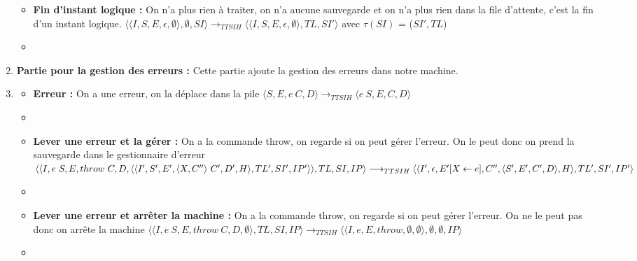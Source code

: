 \documentclass[10pt,a4paper]{report}
\begin{document}
\begin{enumerate}
\begin{itemize}
			\item[] \textbf{Fin d'instant logique :} On n'a plus rien à traiter, on n'a aucune sauvegarde et on n'a plus rien dans la file d'attente, c'est la fin d'un instant logique.
			\smallbreak
			$\langle\langle I,S,E,\epsilon,\emptyset \rangle ,\emptyset,SI\rangle 
			\longrightarrow_{TTSIH} 
			\langle\langle I,S,E,\epsilon,\emptyset\rangle,TL,SI'\rangle$
			avec $\tau(SI)$ = ($SI',TL$) 
			\item[]
			
		\end{itemize}
		\item[] \textbf{Partie pour la gestion des erreurs :} Cette partie ajoute la gestion des erreurs dans notre machine. 
		\item[]
		\begin{itemize}
			\item[] \textbf{Erreur :} On a une erreur, on la déplace dans la pile 
			\smallbreak
			$\langle S,E,e~C,D\rangle 
			\longrightarrow_{TTSIH} 
			\langle e~S,E,C,D\rangle $
			\item[]
			
			\item[] \textbf{Lever une erreur et la gérer :} On a la commande throw, on regarde si on peut gérer l'erreur. On le peut donc on prend la sauvegarde dans le gestionnaire d'erreur
			\smallbreak
			$\langle\langle I, e~S,E,throw~C,D,\langle \langle I',S',E',\langle X,C''\rangle~C',D',H\rangle,TL',SI',IP'\rangle\rangle,TL,SI,IP\rangle 
			\\\longrightarrow_{TTSIH} 
			\langle\langle I',\epsilon,E'[X \leftarrow e],C'',\langle S',E',C',D\rangle,H\rangle,TL',SI',IP'\rangle $
			\item[]
			
			\item[] \textbf{Lever une erreur et arrêter la machine :} On a la commande throw, on regarde si on peut gérer l'erreur. On ne le peut pas donc on arrête la machine
			\smallbreak
			$\langle\langle I,e~S,E,throw~C,D,\emptyset\rangle,TL,SI,IP\rangle 
			\longrightarrow_{TTSIH} 
			\langle\langle I,e,E,throw,\emptyset,\emptyset\rangle,\emptyset,\emptyset,IP\rangle $
			\item[]
			

\end{itemize}
\end{enumerate}
\end{document}
